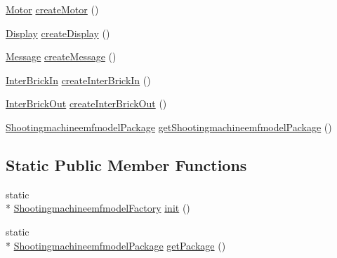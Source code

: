 \begin{DoxyCompactItemize}
\hyperlink{interfaceshootingmachineemfmodel_1_1_motor}{Motor} \hyperlink{classshootingmachineemfmodel_1_1impl_1_1_shootingmachineemfmodel_factory_impl_a24be7db87b17dfde694e02cf8c0a0785}{create\-Motor} ()
\item 
\hyperlink{interfaceshootingmachineemfmodel_1_1_display}{Display} \hyperlink{classshootingmachineemfmodel_1_1impl_1_1_shootingmachineemfmodel_factory_impl_a574fde848121b44a30d65b10dd8b9e4b}{create\-Display} ()
\item 
\hyperlink{interfaceshootingmachineemfmodel_1_1_message}{Message} \hyperlink{classshootingmachineemfmodel_1_1impl_1_1_shootingmachineemfmodel_factory_impl_a36e14fcb3160ccb3a17aac1f4f540928}{create\-Message} ()
\item 
\hyperlink{interfaceshootingmachineemfmodel_1_1_inter_brick_in}{Inter\-Brick\-In} \hyperlink{classshootingmachineemfmodel_1_1impl_1_1_shootingmachineemfmodel_factory_impl_ace031eea035d1dfab54b5b1f01779411}{create\-Inter\-Brick\-In} ()
\item 
\hyperlink{interfaceshootingmachineemfmodel_1_1_inter_brick_out}{Inter\-Brick\-Out} \hyperlink{classshootingmachineemfmodel_1_1impl_1_1_shootingmachineemfmodel_factory_impl_a3fb66c8a156637671163b6970ff6c32f}{create\-Inter\-Brick\-Out} ()
\item 
\hyperlink{interfaceshootingmachineemfmodel_1_1_shootingmachineemfmodel_package}{Shootingmachineemfmodel\-Package} \hyperlink{classshootingmachineemfmodel_1_1impl_1_1_shootingmachineemfmodel_factory_impl_a5be7339d632e63e642b64f8455f19dea}{get\-Shootingmachineemfmodel\-Package} ()
\end{DoxyCompactItemize}
\subsection*{Static Public Member Functions}
\begin{DoxyCompactItemize}
\item 
static \\*
\hyperlink{interfaceshootingmachineemfmodel_1_1_shootingmachineemfmodel_factory}{Shootingmachineemfmodel\-Factory} \hyperlink{classshootingmachineemfmodel_1_1impl_1_1_shootingmachineemfmodel_factory_impl_ad0841c6b6e65880d7b7bcbb789a25bd0}{init} ()
\item 
static \\*
\hyperlink{interfaceshootingmachineemfmodel_1_1_shootingmachineemfmodel_package}{Shootingmachineemfmodel\-Package} \hyperlink{classshootingmachineemfmodel_1_1impl_1_1_shootingmachineemfmodel_factory_impl_a912fc2ef13bd2e8017469fae9a541706}{get\-Package} ()
\end{DoxyCompactItemize}
